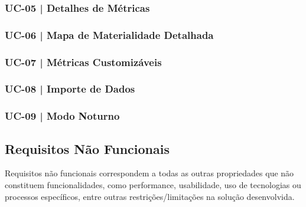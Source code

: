 \subsubsection{UC-05 | Detalhes de Métricas}


\subsubsection{UC-06 | Mapa de Materialidade Detalhada}


\subsubsection{UC-07 | Métricas Customizáveis}


\subsubsection{UC-08 | Importe de Dados}

\subsubsection{UC-09 | Modo Noturno}


\subsection{Requisitos Não Funcionais}

Requisitos não funcionais correspondem a todas as outras propriedades que não constituem funcionalidades, como performance, usabilidade, uso de tecnologias ou processos específicos, entre outras restrições/limitações na solução desenvolvida.

